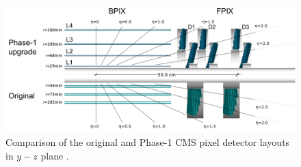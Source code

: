 \begin{figure}[hbtp]
\centering
\includegraphics[scale=0.2]{figures/lhc_and_cms/pixels_layout_comparison.png}
\caption{Comparison of the original and Phase-1 CMS pixel detector layouts in $y-z$ plane \cite{cms_phase1_pixels}.}
\label{pixels_original_vs_phase1}
\end{figure}